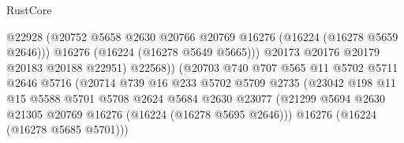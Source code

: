 \begin{lexlean}{RustCore}
\begin{coremodule}
                                            @22928
                                            (@20752
                                              @5658
                                              @2630
                                              @20766
                                              @20769
                                              @16276
                                              (@16224 (@16278 @5659 @2646)))
                                            @16276
                                            (@16224 (@16278 @5649 @5665)))
                                          @20173
                                          @20176
                                          @20179
                                          @20183
                                          @20188
                                          @22951)
                                        @22568))
                                    (@20703
                                      @740
                                      @707
                                      @565
                                      @11
                                      @5702
                                      @5711
                                      @2646
                                      @5716
                                      (@20714
                                        @739
                                        @16
                                        @233
                                        @5702
                                        @5709
                                        @2735
                                        (@23042
                                          @198
                                          @11
                                          @15
                                          @5588
                                          @5701
                                          @5708
                                          @2624
                                          @5684
                                          @2630
                                          @23077
                                          (@21299
                                            @5694
                                            @2630
                                            @21305
                                            @20769
                                            @16276
                                            (@16224 (@16278 @5695 @2646)))
                                          @16276
                                          (@16224 (@16278 @5685 @5701)))

\end{coremodule}
\end{lexlean}
